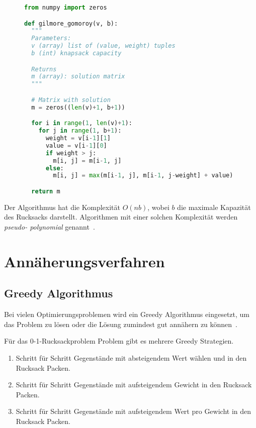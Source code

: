 \documentclass[12pt, a4paper, ngerman]{article}
\begin{document}
\begin{figure}
  \begin{lstlisting}[language=Python,style=light,caption={Gilmore Gomoroy in Python}, label={lst:dyn_opt}]
from numpy import zeros

def gilmore_gomoroy(v, b):
  """
  Parameters: 
  v (array) list of (value, weight) tuples
  b (int) knapsack capacity

  Returns
  m (array): solution matrix
  """

  # Matrix with solution
  m = zeros((len(v)+1, b+1))

  for i in range(1, len(v)+1):
    for j in range(1, b+1):
      weight = v[i-1][1]
      value = v[i-1][0]
      if weight > j:
        m[i, j] = m[i-1, j]
      else:
        m[i, j] = max(m[i-1, j], m[i-1, j-weight] + value)

  return m
\end{lstlisting}
\end{figure}

Der Algorithmus hat die Komplexität \(O(nb)\),
wobei \(b\) die maximale Kapazität des Rucksacks darstellt.
Algorithmen mit einer solchen Komplexität werden \emph{pseudo- polynomial} genannt~\cite{scheiterhauer2008}.


\section{Annäherungsverfahren}

\subsection{Greedy Algorithmus}


Bei vielen Optimierungsproblemen wird ein Greedy Algorithmus eingesetzt,
um das Problem zu lösen oder die Lösung zumindest gut annähern zu können~\cite{paper102}.

Für das 0-1-Rucksackproblem Problem gibt es mehrere Greedy Strategien.

\begin{enumerate}
  \item Schritt für Schritt Gegenstände mit absteigendem Wert wählen und in den Rucksack Packen.
  \item Schritt für Schritt Gegenstände mit aufsteigendem Gewicht in den Rucksack Packen.
  \item Schritt für Schritt Gegenstände mit aufsteigendem Wert pro Gewicht in den Rucksack Packen.
\end{enumerate}
\end{document}
